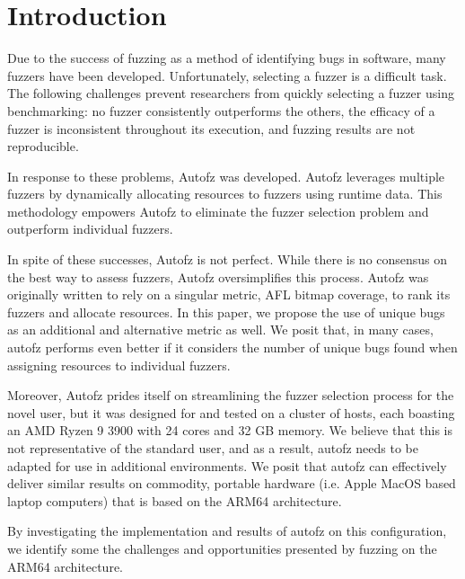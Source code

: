 \section{Introduction}

Due to the success of fuzzing as a method of identifying bugs in software, many fuzzers have been 
developed. Unfortunately, selecting a fuzzer is a difficult task. The following challenges prevent 
researchers from quickly selecting a fuzzer using benchmarking: no fuzzer consistently outperforms 
the others, the efficacy of a fuzzer is inconsistent throughout its execution, and fuzzing results 
are not reproducible.

In response to these problems, Autofz was developed. Autofz leverages multiple fuzzers by dynamically 
allocating resources to fuzzers using runtime data. This methodology empowers Autofz to eliminate the 
fuzzer selection problem and outperform individual fuzzers.

In spite of these successes, Autofz is not perfect. While there is no consensus on the best way to 
assess fuzzers, Autofz oversimplifies this process. Autofz was originally written to rely on a 
singular metric, AFL bitmap coverage, to rank its fuzzers and allocate resources. In this paper, we
propose the use of unique bugs as an additional and alternative metric as well. We posit that, in 
many cases, autofz performs even better if it considers the number of unique bugs found when assigning 
resources to individual fuzzers.

Moreover, Autofz prides itself on streamlining the fuzzer selection process for the novel user, but 
it was designed for and tested on a cluster of hosts, each boasting an AMD Ryzen 9 3900 with 24 cores 
and 32 GB memory. We believe that this is not representative of the standard user, and as a result, 
autofz needs to be adapted for use in additional environments. \cite{fu_autofz_2023} We posit that autofz can 
effectively deliver similar results on commodity, portable hardware (i.e. Apple MacOS based laptop 
computers) that is based on the ARM64 architecture. 

By investigating the implementation and results of autofz on this configuration, we identify some the 
challenges and opportunities presented by fuzzing on the ARM64 architecture.

